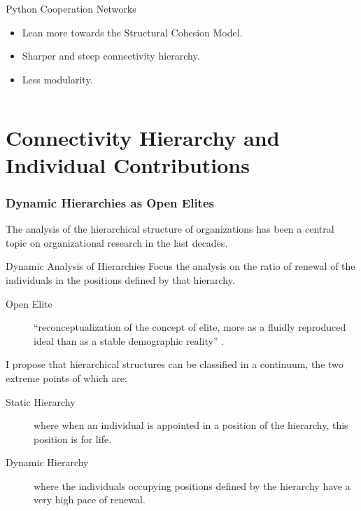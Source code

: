 \documentclass[ignorenonframetext,red,8pt,notes=hide]{beamer}
\begin{document}
\begin{frame}
\begin{columns}[c]
\begin{column}{0.5\textwidth}

\begin{block}{Python Cooperation Networks}
\begin{itemize}
\item Lean more towards the Structural Cohesion Model. 
\item Sharper and steep connectivity hierarchy.
\item Less modularity.
\end{itemize}
\end{block}
\end{column}
\end{columns}

\end{frame}


\section{Connectivity Hierarchy and Individual Contributions}

\begin{frame}
\frametitle{Dynamic Hierarchies as Open Elites}

The analysis of the hierarchical structure of organizations has been a central topic on organizational research in the last decades.

\begin{block}{Dynamic Analysis of Hierarchies}
Focus the analysis on the ratio of renewal of the individuals in the positions defined by that hierarchy.

\begin{description}
\item[Open Elite] ``reconceptualization of the concept of elite, more as a fluidly reproduced ideal than as a stable demographic reality'' \citep[360]{padgett:2010}.
\end{description}

\end{block}

\pause

\vspace{0.5cm}

I propose that hierarchical structures can be classified in a continuum, the two extreme points of which are: 

\begin{description}
\item[Static Hierarchy] where when an individual is appointed in a position of the hierarchy, this position is for life.
\item[Dynamic Hierarchy] where the individuals occupying positions defined by the hierarchy have a very high pace of renewal.
\end{description}

\end{frame}
\end{document}
